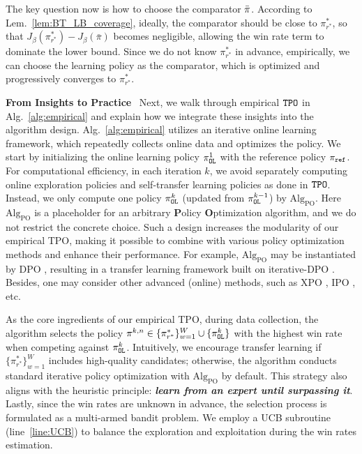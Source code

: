 The key question now is how to choose the comparator $\bar{\pi}$. According to Lem.~\ref{lem:BT_LB_coverage}, ideally, the comparator should be close to $\pi^*_{r^*}$, so that $J_\beta(\pi^*_{r^*}) - J_\beta(\bar{\pi})$ becomes negligible, allowing the win rate term to dominate the lower bound.
Since we do not know $\pi^*_{r^*}$ in advance, empirically, we can choose the learning policy as the comparator, which is optimized and progressively converges to $\pi^*_{r^*}$.
%
%
%

\textbf{From Insights to Practice}~
Next, we walk through empirical ${\texttt{TPO}}$ in Alg.~\ref{alg:empirical} and explain how we integrate these insights into the algorithm design.
Alg.~\ref{alg:empirical} utilizes an iterative online learning framework, which repeatedly collects online data and optimizes the policy.
We start by initializing the online learning policy $\pi^1_{\texttt{OL}}$ with the reference policy $\pi_{\texttt{ref}}$.
For computational efficiency, in each iteration $k$, we avoid separately computing online exploration policies and self-transfer learning policies as done in ${\texttt{TPO}}$. Instead, we only compute one policy $\pi^k_{\texttt{OL}}$ (updated from $\pi^{k-1}_{\texttt{OL}}$) by $\text{Alg}_{\text{PO}}$. Here $\text{Alg}_{\text{PO}}$ is a placeholder for an arbitrary \textbf{P}olicy \textbf{O}ptimization algorithm, and we do not restrict the concrete choice.
Such a design increases the modularity of our empirical TPO, making it possible to combine with various policy optimization methods and enhance their performance.
For example, $\text{Alg}_{\text{PO}}$ may be instantiated by DPO \citep{rafailov2024direct}, resulting in a transfer learning framework built on iterative-DPO  \citep{xiong2024iterative, yuan2024self}.
Besides, one may consider other advanced (online) methods, such as XPO \citep{xie2024exploratory}, IPO \citep{azar2024general}, etc.

As the core ingredients of our empirical TPO, during data collection, the algorithm selects the policy $\pi^{k,n} \in \{\pi^*_{r^*}\}_{w=1}^W \cup \{\pi^k_{\texttt{OL}}\}$ with the highest win rate when competing against $\pi^k_{\texttt{OL}}$.
Intuitively, we encourage transfer learning if $\{\pi^*_{r^*}\}_{w=1}^W$ includes high-quality candidates; otherwise, the algorithm conducts standard iterative policy optimization with $\text{Alg}_{\text{PO}}$ by default.
This strategy also aligns with the heuristic principle: \textbf{\emph{learn from an expert until surpassing it}}.
Lastly, since the win rates are unknown in advance, the selection process is formulated as a multi-armed bandit problem. We employ a UCB subroutine (line~\ref{line:UCB}) to balance the exploration and exploitation during the win rates estimation.
%
%



